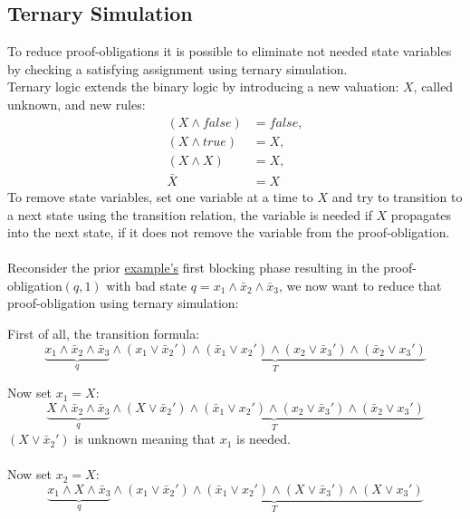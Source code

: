 \documentclass[11pt, a4paper, BCOR=10mm, ngerman]{scrbook}
\begin{document}
\subsection{Ternary Simulation}
To reduce proof-obligations it is possible to eliminate not needed state variables by checking a satisfying assignment using ternary simulation. \\
Ternary logic extends the binary logic by introducing a new valuation: $X$, called unknown, and new rules:
\begin{align*}
(X \land false) &= false, \\ (X \land true) &= X, \\ (X \land X) &= X, \\ \bar X &= X
\end{align*}
To remove state variables, set one variable at a time to $X$ and try to transition to a next state using the transition relation, the variable is needed if $X$ propagates into the next state, if it does not remove the variable from the proof-obligation. \\ \\
Reconsider the prior \hyperref[ex2]{example's} first blocking phase resulting in the proof-obligation$(q, 1)$ with bad state $q = x_1 \land \bar x_2 \land \bar x_3$, we now want to reduce that proof-obligation using ternary simulation: \par


First of all, the transition formula:
\begin{equation*}
\underbrace{x_1 \land \bar x_2 \land \bar x_3}_{q} \land \underbrace{(x_1 \lor \bar x_2' ) \land ( \bar x_1 \lor x_2') \land (x_2 \lor \bar x_3') \land ( \bar x_2 \lor x_3')}_{T}
\end{equation*}

Now set $x_1 = X$: \\
\begin{equation*}
\underbrace{X \land \bar x_2 \land \bar x_3}_{q} \land \underbrace{(X \lor \bar x_2' ) \land ( \bar x_1 \lor x_2') \land (x_2 \lor \bar x_3') \land ( \bar x_2 \lor x_3')}_{T}
\end{equation*}
$(X \lor \bar x_2')$ is unknown meaning that $x_1$  is needed. \\ \\

Now set $x_2 = X$: \\
\begin{equation*}
\underbrace{x_1 \land X \land \bar x_3}_{q} \land \underbrace{(x_1 \lor \bar x_2' ) \land ( \bar x_1 \lor x_2') \land (X \lor \bar x_3') \land ( X \lor x_3')}_{T}
\end{equation*}
\end{document}
